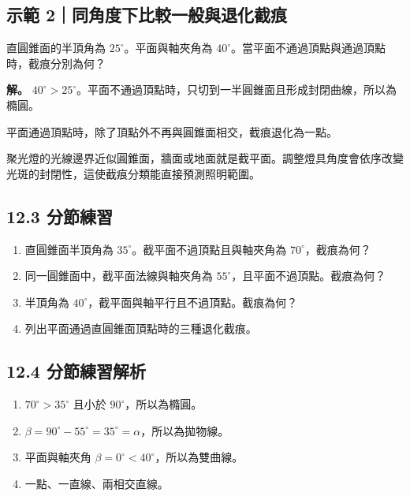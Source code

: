 \documentclass[11pt,a4paper]{article}
\providecommand{\tightlist}{%
  \setlength{\itemsep}{0pt}\setlength{\parskip}{0pt}}
\begin{document}
\subsection{示範 2｜同角度下比較一般與退化截痕}\label{ux793aux7bc4-2ux540cux89d2ux5ea6ux4e0bux6bd4ux8f03ux4e00ux822cux8207ux9000ux5316ux622aux75d5}

直圓錐面的半頂角為 \(25^\circ\)。平面與軸夾角為 \(40^\circ\)。當平面不通過頂點與通過頂點時，截痕分別為何？

\textbf{解。} \(40^\circ>25^\circ\)。平面不通過頂點時，只切到一半圓錐面且形成封閉曲線，所以為橢圓。

平面通過頂點時，除了頂點外不再與圓錐面相交，截痕退化為一點。

聚光燈的光線邊界近似圓錐面，牆面或地面就是截平面。調整燈具角度會依序改變光斑的封閉性，這使截痕分類能直接預測照明範圍。

\subsection{12.3 分節練習}\label{ux5206ux7bc0ux7df4ux7fd2-11}

\begin{enumerate}
\def\labelenumi{\arabic{enumi}.}
\tightlist
\item
  直圓錐面半頂角為 \(35^\circ\)。截平面不過頂點且與軸夾角為 \(70^\circ\)，截痕為何？
\item
  同一圓錐面中，截平面法線與軸夾角為 \(55^\circ\)，且平面不過頂點。截痕為何？
\item
  半頂角為 \(40^\circ\)，截平面與軸平行且不過頂點。截痕為何？
\item
  列出平面通過直圓錐面頂點時的三種退化截痕。
\end{enumerate}

\subsection{12.4 分節練習解析}\label{ux5206ux7bc0ux7df4ux7fd2ux89e3ux6790-11}

\begin{enumerate}
\def\labelenumi{\arabic{enumi}.}
\tightlist
\item
  \(70^\circ>35^\circ\) 且小於 \(90^\circ\)，所以為橢圓。
\item
  \(\beta=90^\circ-55^\circ=35^\circ=\alpha\)，所以為拋物線。
\item
  平面與軸夾角 \(\beta=0^\circ<40^\circ\)，所以為雙曲線。
\item
  一點、一直線、兩相交直線。
\end{enumerate}
\end{document}
